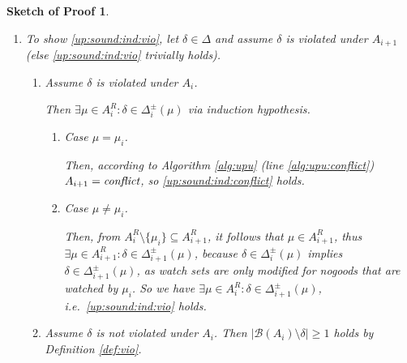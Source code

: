 \documentclass{vutinfth} %
\newtheorem{proof-sketch}{Sketch of Proof}[chapter]
\newcommand{\bass}{\mathcal{B}}
\newcommand{\ass}{A}
\newcommand{\bT}{\mathbf{T}}
\newcommand{\bF}{\mathbf{F}}
\newcommand{\dpm}{\Delta^\pm}
\newcommand{\headf}{H}
\newcommand{\bodyf}{B}
\newcommand{\sgl}{\mu}
\newcommand{\bsgl}{\sigma}
\begin{document}
\begin{proof-sketch}
\begin{enumerate}
\begin{enumerate}
\begin{enumerate}
	\end{enumerate}
\end{enumerate}

\item To show \ref{up:sound:ind:vio}, let $\delta \in \Delta$ and assume $\delta$ is violated under $A_{i+1}$ (else \ref{up:sound:ind:vio} trivially holds).
\begin{enumerate}
\item Assume $\delta$ is violated under $A_i$.

Then $\exists \sgl \in \ass_i^R : \delta \in \dpm_i(\sgl)$ via induction hypothesis.
\begin{enumerate}
\item Case $\sgl = \sgl_i$.

Then, according to Algorithm \ref{alg:upu} (line \ref{alg:upu:conflict}) $A_{i+1} = \emph{conflict}$, so \ref{up:sound:ind:conflict} holds.

\item Case $\sgl \not = \sgl_i$.

Then, from $\ass_{i}^R \setminus \{ \sgl_i \} \subseteq \ass_{i+1}^R$, it follows that $\sgl \in \ass_{i+1}^R$, thus $\exists \sgl \in \ass_{i+1}^R : \delta \in \dpm_{i+1}(\sgl)$, because $\delta \in \dpm_i(\sgl)$ implies $\delta \in \dpm_{i+1}(\sgl)$, as watch sets are only modified for nogoods that are watched by $\sgl_i$. So we have $\exists \sgl \in \ass_i^R : \delta \in \dpm_{i+1}(\sgl)$, i.e.~\ref{up:sound:ind:vio} holds.
\end{enumerate}
\item Assume $\delta$ is not violated under $A_i$. Then $|\bass(A_i) \setminus \delta| \geq 1$  holds by Definition \ref{def:vio}.


\end{enumerate}
\end{enumerate}
\end{proof-sketch}
\end{document}
